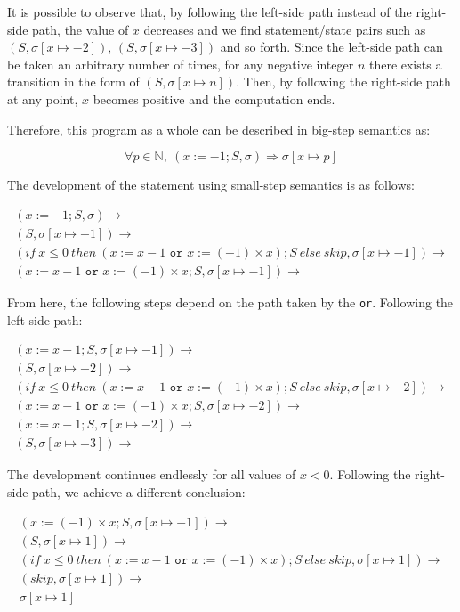 \documentclass[11pt]{article}
\begin{document}
\begin{enumerate}
	It is possible to observe that, by following the left-side path instead of the right-side path, the value of $x$ decreases and we find statement/state pairs such as $(S,\sigma[x\mapsto -2])$, $(S,\sigma[x\mapsto -3])$ and so forth. Since the left-side path can be taken an arbitrary number of times, for any negative integer $n$ there exists a transition in the form of $(S,\sigma[x\mapsto n])$. Then, by following the right-side path at any point, $x$ becomes positive and the computation ends.
	
	Therefore, this program as a whole can be described in big-step semantics as:
	
	\begin{equation*}
		\forall p\in \mathbb{N},\ (x:= -1; S,\sigma) \Rightarrow \sigma[x\mapsto p]
	\end{equation*}
		
	The development of the statement using small-step semantics is as follows:
	
		\begin{align*}
		(x:=-1; S,\sigma) \rightarrow \\
		(S,\sigma[x\mapsto-1]) \rightarrow \\
		(if\ x\leq 0\ then\ (x:=x-1\texttt{ or }x:= (-1)\times x); S\ else\ skip,\sigma[x\mapsto-1]) \rightarrow \\
		(x:=x-1\texttt{ or }x:= (-1)\times x; S,\sigma[x\mapsto-1]) \rightarrow
		\end{align*}

		From here, the following steps depend on the path taken by the \texttt{or}. Following the left-side path:
		
		\begin{align*}
		(x:=x-1; S,\sigma[x\mapsto-1]) \rightarrow \\
		(S,\sigma[x\mapsto-2]) \rightarrow \\
		(if\ x\leq 0\ then\ (x:=x-1\texttt{ or }x:= (-1)\times x); S\ else\ skip,\sigma[x\mapsto-2]) \rightarrow\\
		(x:=x-1\texttt{ or }x:= (-1)\times x; S,\sigma[x\mapsto-2]) \rightarrow\\
		(x:=x-1; S,\sigma[x\mapsto-2]) \rightarrow \\
		(S,\sigma[x\mapsto-3]) \rightarrow
		\end{align*}
		
		The development continues endlessly for all values of $x < 0$. Following the right-side path, we achieve a different conclusion:
		
		\begin{align*}
		(x:=(-1)\times x; S,\sigma[x\mapsto-1]) \rightarrow \\
		(S,\sigma[x\mapsto1]) \rightarrow \\
		(if\ x\leq 0\ then\ (x:=x-1\texttt{ or }x:= (-1)\times x); S\ else\ skip,\sigma[x\mapsto1]) \rightarrow \\
		(skip,\sigma[x\mapsto1]) \rightarrow \\
		\sigma[x\mapsto 1]
		\end{align*}
		

\end{enumerate}
\end{document}
